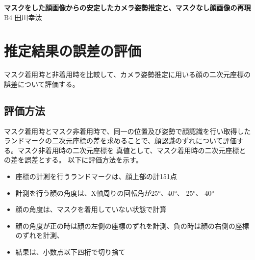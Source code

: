 \documentclass[]{jarticle}          %
\begin{document}

\vspace*{2ex}
\begin{center}
 {\Large \bf マスクをした顔画像からの安定したカメラ姿勢推定と、マスクなし顔画像の再現
 }\\ %
 \vspace*{5mm}
 {\large B4 田川幸汰}%
\end{center}






\section{推定結果の誤差の評価}
マスク着用時と非着用時を比較して、カメラ姿勢推定に用いる顔の二次元座標の誤差について評価する。

\subsection{評価方法}
マスク着用時とマスク非着用時で、同一の位置及び姿勢で顔認識を行い取得したランドマークの二次元座標の差を求めることで、顔認識のずれについて評価する。マスク非着用時の二次元座標を
真値として、マスク着用時の二次元座標との差を誤差とする。
以下に評価方法を示す。
\begin{itemize}
  \item 座標の計測を行うランドマークは、顔上部の計151点
  \item 計測を行う顔の角度は、X軸周りの回転角が25°、40°、-25°、-40°
  \item 顔の角度は、マスクを着用していない状態で計算
  \item 顔の角度が正の時は顔の左側の座標のずれを計測、負の時は顔の右側の座標のずれを計測、
  \item 結果は、小数点以下四桁で切り捨て
\end{itemize}
\end{document}
